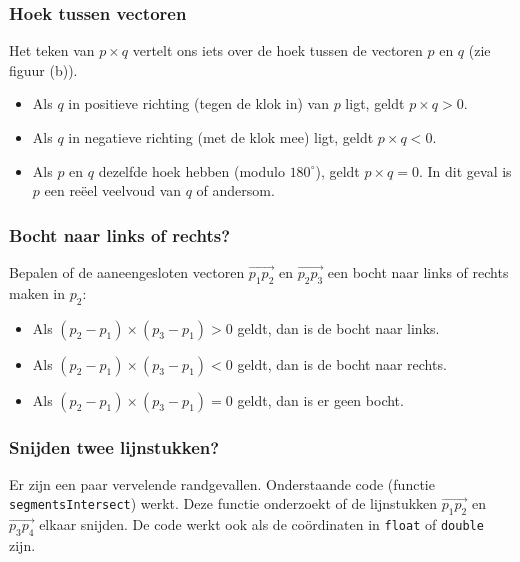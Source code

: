 \documentclass[10pt,a4paper,titlepage]{article}
\begin{document}
\subsubsection{Hoek tussen vectoren}
Het teken van $p\times q$ vertelt ons iets over de hoek tussen de vectoren $p$ en $q$ (zie figuur (b)).
\begin{itemize}[noitemsep,nolistsep]
	\item Als $q$ in positieve richting (tegen de klok in) van $p$ ligt, geldt $p\times q > 0$.
	\item Als $q$ in negatieve richting (met de klok mee) ligt, geldt $p\times q < 0$.
	\item Als $p$ en $q$ dezelfde hoek hebben (modulo $180^\circ$), geldt $p\times q = 0$. In dit geval is $p$ een re\"eel veelvoud van $q$ of andersom.
\end{itemize}

\subsubsection{Bocht naar links of rechts?}

Bepalen of de aaneengesloten vectoren $\overrightarrow{p_1p_2}$ en $\overrightarrow{p_2p_3}$ een bocht naar links of rechts maken in $p_2$:
\begin{itemize}[noitemsep,nolistsep]
	\item Als $(p_2 - p_1)\times (p_3 - p_1) > 0$ geldt, dan is de bocht naar links.
	\item Als $(p_2 - p_1)\times (p_3 - p_1) < 0$ geldt, dan is de bocht naar rechts.
	\item Als $(p_2 - p_1)\times (p_3 - p_1) = 0$ geldt, dan is er geen bocht.
\end{itemize}

\subsubsection{Snijden twee lijnstukken?}
Er zijn een paar vervelende randgevallen. Onderstaande code (functie \texttt{segmentsIntersect}) werkt. Deze functie onderzoekt of de lijnstukken $\overrightarrow{p_1p_2}$ en $\overrightarrow{p_3p_4}$ elkaar snijden. De code werkt ook als de co\"ordinaten in \texttt{float} of \texttt{double} zijn.



\end{document}
